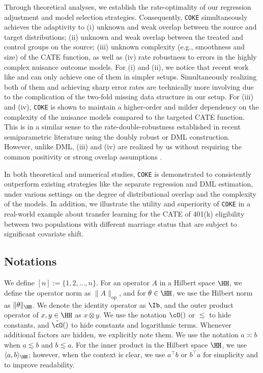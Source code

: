 \documentclass[12pt,a4paper,pdftex,onepage]{article}
\newcommand{\op}{\operatorname{op}}
\begin{document}
Through theoretical analyses, we establish the rate-optimality of our regression adjustment and model selection strategies. Consequently, \texttt{COKE} simultaneously achieves the adaptivity to (i) unknown and weak overlap between the source and target distributions; (ii) unknown and weak overlap between the treated and control groups on the source; (iii) unknown complexity (e.g., smoothness and size) of the CATE function, as well as (iv) rate robustness to errors in the highly complex nuisance outcome models. For (i) and (ii), we notice that recent work like \cite{wang2023pseudo} and \cite{mou2023kernel} can only achieve one of them in simpler setups. Simultaneously realizing both of them and achieving sharp error rates are technically more involving due to the complication of the two-fold missing data structure in our setup. For (iii) and (iv), \texttt{COKE} is shown to maintain a higher-order and milder dependency on the complexity of the nuisance models compared to the targeted CATE function. This is in a similar sense to the rate-double-robustness established in recent semiparametric literature \citep[e.g.]{kennedy2020towards} using the doubly robust or DML construction. However, unlike DML, (iii) and (iv) are realized by us without requiring the common positivity or strong overlap assumptions \citep{rosenbaum1983central}. 


In both theoretical and numerical studies, \texttt{COKE} is demonstrated to consistently outperform existing strategies like the separate regression and DML estimation, under various settings on the degree of distributional overlap and the complexity of the models. In addition, we illustrate the utility and superiority of \texttt{COKE} in a real-world example about transfer learning for the CATE of 401(k) eligibility between two populations with different marriage status that are subject to significant covariate shift. 




\subsection{Notations}
We define \( [n] := \{1, 2, \dots, n\} \).  
For an operator \( A \) in a Hilbert space \( \HH \), we define the operator norm as \( \|A\|_{\op} \), and for \( \theta \in \HH \), we use the Hilbert norm as \( \|\theta\|_{\HH} \).  
We denote the identity operator as \( \Ib \), and the outer product operator of \( x, y \in \HH \) as \( x \otimes y \).  
We use the notation \( \cO() \) or \( \lesssim \) to hide constants, and \( \tilde{\cO}() \) to hide constants and logarithmic terms.  
Whenever additional factors are hidden, we explicitly note them.  
We use the notation \( a \asymp b \) when \( a \lesssim b \) and \( b \lesssim a \).  
For the inner product in the Hilbert space \( \HH \), we use \( \langle a, b \rangle_\HH \); however, when the context is clear, we use \( a^\top b \) or \( b^\top a \) for simplicity and to improve readability.
\end{document}

